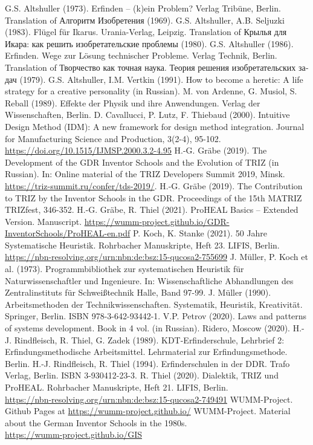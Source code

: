 \documentclass[12pt,a4paper]{article}
\begin{document}
\newpage
\begin{thebibliography}{xxx}
 G.S. Altshuller (1973). Erfinden – (k)ein Problem? Verlag Tribüne,
  Berlin.  Translation of \foreignlanguage{russian}{Алгоритм Изобретения}
  (1969).
 G.S. Altshuller, A.B. Seljuzki (1983). Flügel für Ikarus.
  Urania-Verlag, Leipzig. Translation of \foreignlanguage{russian}{Крылья для
    Икара: как решить изобретательские проблемы} (1980).
 G.S. Altshuller (1986). Erfinden. Wege zur Lösung technischer
  Probleme. Verlag Technik, Berlin. Translation of
  \foreignlanguage{russian}{Творчество как точная наука. Теория решения
    изобретательских задач} (1979).
 G.S. Altshuller, I.M. Vertkin (1991). How to become a heretic: A
  life strategy for a creative personality (in Russian).  
 M. von Ardenne, G. Musiol, S. Reball (1989). Effekte der Physik
  und ihre Anwendungen. Verlag der Wissenschaften, Berlin.
 D. Cavallucci, P. Lutz, F. Thiebaud (2000). Intuitive Design
  Method (IDM): A new framework for design method integration. Journal for
  Manufacturing Science and Production, 3(2-4), 95-102.
  \url{https://doi.org/10.1515/IJMSP.2000.3.2-4.95}
 H.-G. Gräbe (2019). The Development of the GDR Inventor Schools
  and the Evolution of TRIZ (in Russian). In: Online material of the TRIZ
  Developers Summit 2019, Minsk.
  \url{https://triz-summit.ru/confer/tds-2019/}. 
 H.-G. Gräbe (2019). The Contribution to TRIZ by the Inventor
  Schools in the GDR.  Proceedings of the 15th MATRIZ TRIZfest, 346-352.
 H.-G. Gräbe, R. Thiel (2021). ProHEAL Basics – Extended
  Version. Manuscript.
  \url{https://wumm-project.github.io/GDR-InventorSchools/ProHEAL-en.pdf}
 P. Koch, K. Stanke (2021). 50 Jahre Systematische Heuristik.
  Rohrbacher Manu\-skripte, Heft 23. LIFIS, Berlin.\\
  \url{https://nbn-resolving.org/urn:nbn:de:bsz:15-qucosa2-755699}
 J. Müller, P. Koch et al. (1973). Programmbibliothek zur
  systematischen Heuristik für Naturwissenschaftler und Ingenieure. In:
  Wissenschaftliche Abhandlungen des Zentralinstituts für Schweißtechnik
  Halle, Band 97-99.
 J. Müller (1990). Arbeitsmethoden der Technikwissenschaften.
  Systematik, Heuristik, Kreativität. Springer, Berlin. ISBN
  978-3-642-93442-1. 
 V.P. Petrov (2020). Laws and patterns of systems development.
  Book in 4 vol. (in Russian).  Ridero, Moscow (2020).
 H.-J. Rindfleisch, R. Thiel, G. Zadek (1989). KDT-Erfinderschule,
  Lehrbrief 2: Erfindungsmethodische Arbeitsmittel. Lehrmaterial zur
  Erfindungsmethode. Berlin.
 H.-J. Rindfleisch, R. Thiel (1994). Erfinderschulen in der DDR.
  Trafo Verlag, Berlin. ISBN 3-930412-23-3.
 R. Thiel (2020). Dialektik, TRIZ und ProHEAL. Rohrbacher
  Manuskripte, Heft 21.  LIFIS, Berlin.\\
  \url{https://nbn-resolving.org/urn:nbn:de:bsz:15-qucosa2-749491}
 WUMM-Project. Github Pages at
  \url{https://wumm-project.github.io/}
 WUMM-Project. Material about the German Inventor Schools in the
  1980s. \\ \url{https://wumm-project.github.io/GIS}
\end{thebibliography}
\newpage
\end{document}
